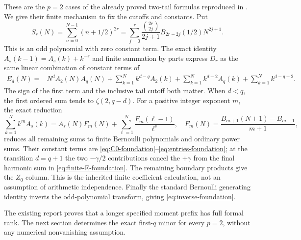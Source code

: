 These are the $p=2$ cases of the already proved two-tail formulas
reproduced in \cite[Section 7]{CanonicalFifth}. We give their finite
mechanism to fix the cutoffs and constants. Put
\[
 S_r(N)=\sum_{n=0}^{N-1}(n+1/2)^{2r}
       =\sum_{j=0}^r\frac{\binom{2r}{2j}}{2j+1}
                        B_{2r-2j}(1/2)N^{2j+1}.
\]
This is an odd polynomial with zero constant term. The exact identity
$A_s(k-1)=A_s(k)+k^{-s}$ and finite summation by parts express $D_r$
as the same linear combination of constant terms of
\begin{align}\label{eq:finite-E-foundation}
 E_d(N)={}&N^dA_2(N)A_q(N)
 +\sum_{k=1}^N k^{d-q}A_2(k)
 +\sum_{k=1}^N k^{d-2}A_q(k)
 +\sum_{k=1}^N k^{d-q-2}.
\end{align}
The sign of the first term and the inclusive tail cutoff both
matter. When $d<q$, the first ordered sum tends to
$\zeta(2,q-d)$. For a positive integer exponent $m$, the exact reduction
\begin{equation}\label{eq:finite-Faulhaber-foundation}
 \sum_{k=1}^N k^m A_s(k)
 =A_s(N)F_m(N)+\sum_{\ell=1}^N\frac{F_m(\ell-1)}{\ell^s},
 \quad F_m(N)=\frac{B_{m+1}(N+1)-B_{m+1}}{m+1},
\end{equation}
reduces all remaining sums to finite Bernoulli polynomials and
ordinary power sums. Their constant terms are
\eqref{eq:C0-foundation}--\eqref{eq:entries-foundation}; at the
transition $d=q+1$ the two $-\gamma/2$ contributions cancel the
$+\gamma$ from the final harmonic sum in
\eqref{eq:finite-E-foundation}. The remaining boundary products give
the $Z_0$ column. This is the inherited finite coefficient calculation,
not an assumption of arithmetic independence. Finally the standard
Bernoulli generating identity inverts the odd-polynomial transform,
giving \eqref{eq:inverse-foundation}.

The existing report proves that a longer specified moment prefix
has full formal rank. The next section determines the exact first-$q$
minor for every $p=2$, without any numerical nonvanishing assumption.
